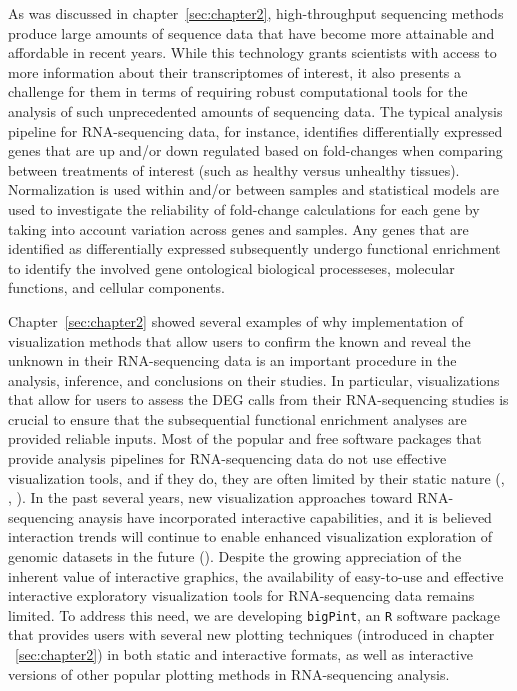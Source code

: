 \documentclass[11pt,a4paper,oldfontcommands,openany]{memoir}
\numberwithin{equation}{section} %
\newcommand{\pkg}[1]{{\texttt{#1}}}
\begin{document}
As was discussed in chapter~\ref{sec:chapter2}, high-throughput sequencing methods produce large amounts of sequence data that have become more attainable and affordable in recent years. While this technology grants scientists with access to more information about their transcriptomes of interest, it also presents a challenge for them in terms of requiring robust computational tools for the analysis of such unprecedented amounts of sequencing data. The typical analysis pipeline for RNA-sequencing data, for instance, identifies differentially expressed genes that are up and/or down regulated based on fold-changes when comparing between treatments of interest (such as healthy versus unhealthy tissues). Normalization is used within and/or between samples and statistical models are used to investigate the reliability of fold-change calculations for each gene by taking into account variation across genes and samples. Any genes that are identified as differentially expressed subsequently undergo functional enrichment to identify the involved gene ontological biological processeses, molecular functions, and cellular components. 

Chapter~\ref{sec:chapter2} showed several examples of why implementation of visualization methods that allow users to confirm the known and reveal the unknown in their RNA-sequencing data is an important procedure in the analysis, inference, and conclusions on their studies. In particular, visualizations that allow for users to assess the DEG calls from their RNA-sequencing studies is crucial to ensure that the subsequential functional enrichment analyses are provided reliable inputs. Most of the popular and free software packages that provide analysis pipelines for RNA-sequencing data do not use effective visualization tools, and if they do, they are often limited by their static nature (\citealt{deseq2}, \citealt{edger}, \citealt{limma}). In the past several years, new visualization approaches toward RNA-sequencing anaysis have incorporated interactive capabilities, and it is believed interaction trends will continue to enable enhanced visualization exploration of genomic datasets in the future (\citealt{vizReview}). Despite the growing appreciation of the inherent value of interactive graphics, the availability of easy-to-use and effective interactive exploratory visualization tools for RNA-sequencing data remains limited. To address this need, we are developing \pkg{bigPint}, an \pkg{R} software package that provides users with several new plotting techniques (introduced in chapter ~\ref{sec:chapter2}) in both static and interactive formats, as well as interactive versions of other popular plotting methods in RNA-sequencing analysis.
\end{document}
